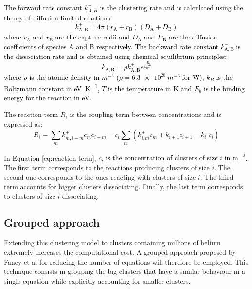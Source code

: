 \textcolor{black}{The \textcolor{black}{forward} rate constant $k^+_{A,B}$ is the clustering rate and is calculated using the theory of diffusion-limited reactions:
\begin{equation}
    k^+_\mathrm{A,B} = 4 \pi (r_\mathrm{A} + r_\mathrm{B}) (D_\mathrm{A} + D_\mathrm{B})
\end{equation}
where $r_\mathrm{A}$ and $r_\mathrm{B}$ are the capture radii and $D_\mathrm{A}$ and $D_\mathrm{B}$ are the diffusion coefficients of species A and B respectively.
The \textcolor{black}{backward} rate constant $k^-_\mathrm{A,B}$ is the dissociation rate and is obtained using chemical equilibrium principles:
\begin{equation}
    k^-_\mathrm{A,B} =\rho k^+_\mathrm{A,B}e^{\frac{-E_b}{k_B T}}
\end{equation}
where $\rho$ is the atomic density in $\si{m^{-3}}$ ($\rho = \SI{6.3e28}{m^{-3}}$ for W), $k_B$ is the Boltzmann constant in \si{eV.K^{-1}}, $T$ is the temperature in \si{K} and $E_b$ is the binding energy for the reaction  in \si{eV}.}

The reaction term $R_i$ is the coupling term between concentrations and is expressed as:
\textcolor{black}{
\begin{equation}
    R_i=  \sum_{m} k^+_{m,i-m} c_m c_{i-m}  - c_i \sum_m \left( k_{i, m}^+ c_{m} + k_{i+1}^- c_{i+1} -  k_i^- c_i \right)
    \label{eq:reaction term}
\end{equation}
}

In Equation \ref{eq:reaction term}, \textcolor{black}{$c_i$ is the concentration of clusters of size $i$ in \si{m^{-3}}}.
The first term corresponds to the reactions producing clusters of size $i$.
The second one corresponds to the ones reacting with clusters of size $i$.
The third term accounts for bigger clusters dissociating.
Finally, the last term corresponds to clusters of size $i$ dissociating.

\subsection{Grouped approach}
Extending this clustering model to clusters containing millions of helium extremely increases the computational cost.
A grouped approach proposed by Faney et al  for reducing the number of equations will therefore be employed.
This technique consists in grouping the big clusters \textcolor{black}{that} have a similar behaviour in a single equation while explicitly \textcolor{black}{accounting} for smaller clusters.

